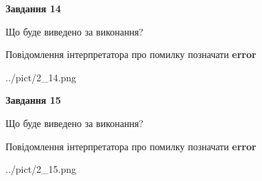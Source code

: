 \documentclass[11pt, ukrainian]{article}
\begin{document}
{\begin {large}
{\begin {center}\textbf{Завдання 14}\end {center}}\par
Що буде виведено за виконання? \par
Повідомлення інтерпретатора про помилку позначати \textbf{error}

\begin{center}
	{../pict/2_14.png}
\end{center}
\newpage

{\begin {center}\textbf{Завдання 15}\end {center}}\par
Що буде виведено за виконання? \par
Повідомлення інтерпретатора про помилку позначати \textbf{error}

\begin{center}
	{../pict/2_15.png}
\end{center}
\newpage

\end {large}}
\end{document}
